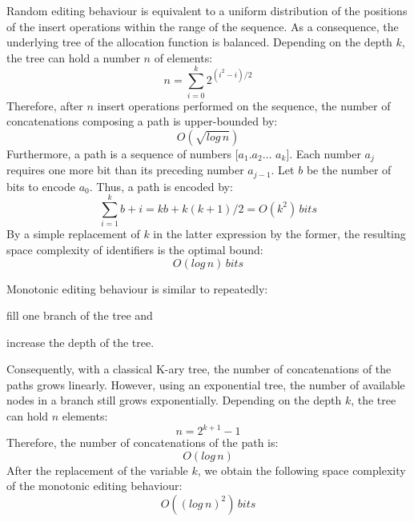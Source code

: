 \begin{asparadesc}
\item [Random editing behaviour] is equivalent to a uniform distribution of the
  positions of the insert operations within the range of the sequence. As a
  consequence, the underlying tree of the allocation function is
  balanced. Depending on the depth $k$, the tree can hold a number $n$ of
  elements: \begin{equation} n = \sum\limits_{i=0}^{k}
    {2^{(i^2-i)/2}} \end{equation} Therefore, after $n$ insert operations
  performed on the sequence, the number of concatenations composing a path is
  upper-bounded by:
  \begin{equation} O(\sqrt{log\,n}) \end{equation} Furthermore, a path is a
  sequence of numbers $[a_1.a_2\ldots$ $a_k]$. Each number $a_j$ requires one
  more bit than its preceding number $a_{j-1}$. Let $b$ be the number of bits
  to encode $a_0$. Thus, a path is encoded by:
  \begin{equation} \sum\limits_{i=1}^{k}b+i = kb + k(k+1)/2 = O(k^2) \,
    bits \end{equation} By a simple replacement of $k$ in the latter expression
  by the former, the resulting space complexity of identifiers is the optimal
  bound:
  \begin{equation} O(log\,n) \, bits \end{equation}
  
\item[Monotonic editing behaviour] is similar to repeatedly:
  \begin{inparaenum}[(i)]
  \item fill one branch of the tree and
  \item increase the depth of the tree.
  \end{inparaenum} Consequently, with a classical K-ary tree, the number of
  concatenations of the paths grows linearly. However, using an
  exponential tree, the number of available nodes in a branch still grows
  exponentially. Depending on the depth $k$, the tree can hold $n$ elements:
  \begin{equation} n = 2^{k+1}-1 \end{equation} Therefore, the number of
  concatenations of the path is:
  \begin{equation} O(log\,n) \end{equation} After the replacement of the
  variable $k$, we obtain the following space complexity of the monotonic
  editing behaviour:
  \begin{equation} O((log\,n)^2) \, bits \end{equation}


\end{asparadesc}
